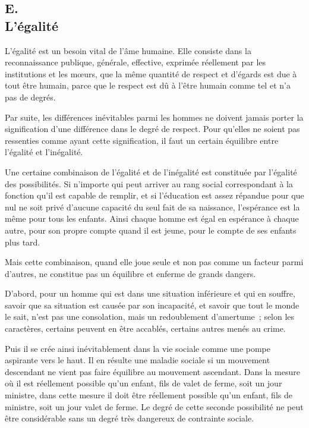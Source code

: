 \documentclass[french,twoside]{book} %
\begin{document}
\subsection[E. L'égalité]{E. \\
L'égalité}
\noindent \par
L'égalité est un besoin vital de l'âme humaine. Elle consiste dans la reconnaissance publique, générale, effective, exprimée réellement par les institutions et les mœurs, que la même quantité de respect et d'égards est due à tout être humain, parce que le respect est dû à l'être humain comme tel et n'a pas de degrés.\par
Par suite, les différences inévitables parmi les hommes ne doivent jamais porter la signification d'une différence dans le degré de respect. Pour qu'elles ne soient pas ressenties comme ayant cette signification, il faut un certain équilibre entre l'égalité et l'inégalité.\par
Une certaine combinaison de l'égalité et de l'inégalité est constituée par l'égalité des possibilités. Si n'importe qui peut arriver au rang social correspondant à la fonction qu'il est capable de remplir, et si l'éducation est assez répandue pour que nul ne soit privé d'aucune capacité du seul fait de sa naissance, l'espérance est la même pour tous les enfants. Ainsi chaque homme est égal en espérance à chaque autre, pour son propre compte quand il est jeune, pour le compte de ses enfants plus tard.\par
Mais cette combinaison, quand elle joue seule et non pas comme un facteur parmi d'autres, ne constitue pas un équilibre et enferme de grands dangers.\par
D'abord, pour un homme qui est dans une situation inférieure et qui en souffre, savoir que sa situation est causée par son incapacité, et savoir que tout le monde le sait, n'est pas une consolation, mais un redoublement d'amertume ; selon les caractères, certains peuvent en être accablés, certains autres menés au crime.\par
Puis il se crée ainsi inévitablement dans la vie sociale comme une pompe aspirante vers le haut. Il en résulte une maladie sociale si un mouvement descendant ne vient pas faire équilibre au mouvement ascendant. Dans la mesure où il est réellement possible qu'un enfant, fils de valet de ferme, soit un jour ministre, dans cette mesure il doit être réellement possible qu'un enfant, fils de ministre, soit un jour valet de ferme. Le degré de cette seconde possibilité ne peut être considérable sans un degré très dangereux de contrainte sociale.\par
\end{document}
